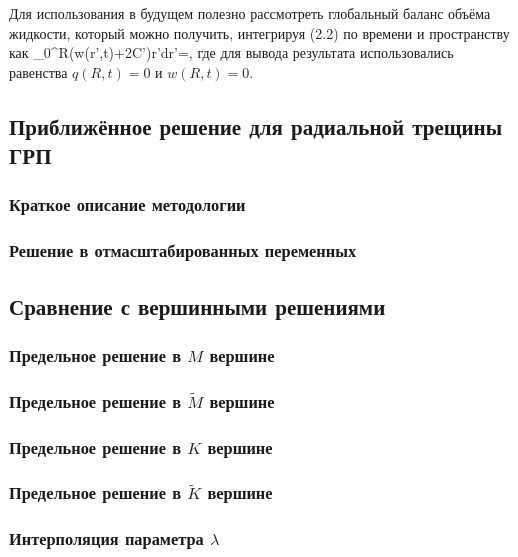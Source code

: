 \documentclass[main.tex]{subfiles}
\begin{document}
Для использования в будущем полезно рассмотреть глобальный баланс объёма жидкости, который можно получить, интегрируя (2.2) по времени и пространству как
\beq
\int\limits_{0}^{R}{\left(w(r',t)+2C'\right)r'dr'}=,
\eeq
где для вывода результата использовались равенства $q(R,t)=0$ и $w(R,t)=0$.

\subsection{Приближённое решение для радиальной трещины ГРП}

\subsubsection{Краткое описание методологии}

\subsubsection{Решение в отмасштабированных переменных}

\subsection{Сравнение с вершинными решениями}

\subsubsection{Предельное решение в $M$ вершине}

\subsubsection{Предельное решение в $\tilde{M}$ вершине}

\subsubsection{Предельное решение в $K$ вершине}

\subsubsection{Предельное решение в $\tilde{K}$ вершине}

\subsubsection{Интерполяция параметра $\lambda$}
\end{document}
